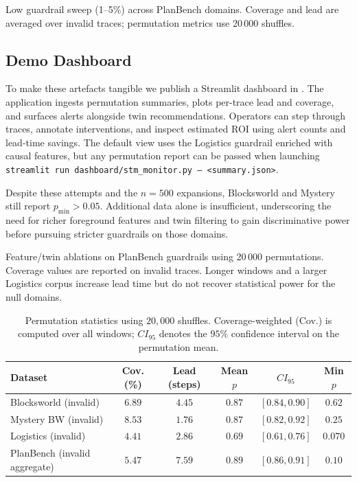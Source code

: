 \documentclass[11pt]{article}
\begin{document}
\begin{table}[t]
  \centering
  \caption{Low guardrail sweep (1--5\%) across PlanBench domains. Coverage and lead are averaged over invalid traces; permutation metrics use 20\,000 shuffles.}
  \label{tab:guardrail-dynamic}
  
\end{table}

\subsection{Demo Dashboard}
\label{subsec:demo-dashboard}
To make these artefacts tangible we publish a Streamlit dashboard in
. The application ingests permutation summaries,
plots per-trace lead and coverage, and surfaces alerts alongside twin
recommendations. Operators can step through traces, annotate interventions, and
inspect estimated ROI using alert counts and lead-time savings. The default view
uses the Logistics guardrail enriched with causal features, but any permutation
report can be passed when launching
\mbox{\texttt{streamlit run dashboard/stm\_monitor.py -- <summary.json>}}.

Despite these attempts and the $n=500$ expansions, Blocksworld and Mystery still report $p_{\min} > 0.05$.
Additional data alone is insufficient, underscoring the need for richer
foreground features and twin filtering to gain discriminative power before
pursuing stricter guardrails on those domains.

\begin{table}[t]
  \centering
  \caption{Feature/twin ablations on PlanBench guardrails using 20\,000 permutations. Coverage values are reported on invalid traces. Longer windows and a larger Logistics corpus increase lead time but do not recover statistical power for the null domains.}
  \label{tab:feature-ablation}
  
\end{table}

\begin{table}[h]
  \centering
  \caption{Permutation statistics using $20{,}000$ shuffles. Coverage-weighted (Cov.) is computed over all windows; $CI_{95}$ denotes the $95\%$ confidence interval on the permutation mean.}
  \label{tab:permutation}
  \begin{tabular}{lccccc}
    \toprule
    Dataset & Cov. (\%) & Lead (steps) & Mean $p$ & $CI_{95}$ & Min $p$ \\
    \midrule
    Blocksworld (invalid) & $6.89$ & $4.45$ & $0.87$ & $[0.84, 0.90]$ & $0.62$ \\
    Mystery BW (invalid) & $8.53$ & $1.76$ & $0.87$ & $[0.82, 0.92]$ & $0.25$ \\
    Logistics (invalid) & $4.41$ & $2.86$ & $0.69$ & $[0.61, 0.76]$ & $0.070$ \\
    PlanBench (invalid aggregate) & $5.47$ & $7.59$ & $0.89$ & $[0.86, 0.91]$ & $0.10$ \\
    \bottomrule
  \end{tabular}
\end{table}
\end{document}
